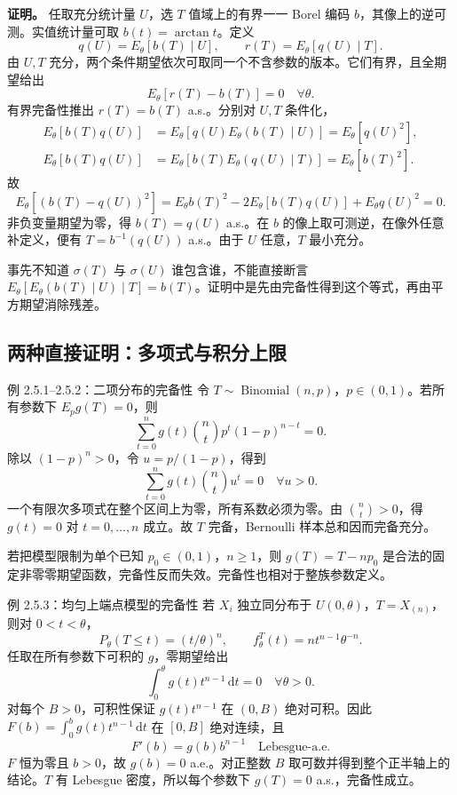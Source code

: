 \textbf{证明。} 任取充分统计量 $U$，选 $T$ 值域上的有界一一 Borel 编码 $b$，其像上的逆可测。实值统计量可取 $b(t)=\arctan t$。定义
\[
 q(U)=E_\theta[b(T)\mid U],\qquad
 r(T)=E_\theta[q(U)\mid T].
\]
由 $U,T$ 充分，两个条件期望依次可取同一个不含参数的版本。它们有界，且全期望给出
\[
 E_\theta[r(T)-b(T)]=0\quad\forall\theta.
\]
有界完备性推出 $r(T)=b(T)$ a.s.。分别对 $U,T$ 条件化，
\[
 \begin{aligned}
 E_\theta[b(T)q(U)]
 &=E_\theta[q(U)E_\theta(b(T)\mid U)]
 =E_\theta[q(U)^2],\\
 E_\theta[b(T)q(U)]
 &=E_\theta[b(T)E_\theta(q(U)\mid T)]
 =E_\theta[b(T)^2].
 \end{aligned}
\]
故
\[
 E_\theta[(b(T)-q(U))^2]
 =E_\theta b(T)^2-2E_\theta[b(T)q(U)]+E_\theta q(U)^2=0.
\]
非负变量期望为零，得 $b(T)=q(U)$ a.s.。在 $b$ 的像上取可测逆，在像外任意补定义，便有 $T=b^{-1}(q(U))$ a.s.。由于 $U$ 任意，$T$ 最小充分。

\begin{notebox}[为什么不能直接用塔式性质？]
事先不知道 $\sigma(T)$ 与 $\sigma(U)$ 谁包含谁，不能直接断言
$E_\theta[E_\theta(b(T)\mid U)\mid T]=b(T)$。证明中是先由完备性得到这个等式，再由平方期望消除残差。
\end{notebox}

\subsection{两种直接证明：多项式与积分上限}
\begin{examplebox}{例 2.5.1--2.5.2：二项分布的完备性}
令 $T\sim\operatorname{Binomial}(n,p)$，$p\in(0,1)$。若所有参数下 $E_pg(T)=0$，则
\[
 \sum_{t=0}^n g(t)\binom ntp^t(1-p)^{n-t}=0.
\]
除以 $(1-p)^n>0$，令 $u=p/(1-p)$，得到
\[
 \sum_{t=0}^ng(t)\binom ntu^t=0\quad\forall u>0.
\]
一个有限次多项式在整个区间上为零，所有系数必须为零。由 $\binom nt>0$，得 $g(t)=0$ 对 $t=0,\ldots,n$ 成立。故 $T$ 完备，Bernoulli 样本总和因而完备充分。
\end{examplebox}

若把模型限制为单个已知 $p_0\in(0,1)$，$n\ge1$，则 $g(T)=T-np_0$ 是合法的固定非零零期望函数，完备性反而失效。完备性也相对于整族参数定义。

\begin{examplebox}{例 2.5.3：均匀上端点模型的完备性}
若 $X_i$ 独立同分布于 $U(0,\theta)$，$T=X_{(n)}$，则对 $0<t<\theta$，
\[
 P_\theta(T\le t)=(t/\theta)^n,\qquad
 f_\theta^T(t)=nt^{n-1}\theta^{-n}.
\]
任取在所有参数下可积的 $g$，零期望给出
\[
 \int_0^\theta g(t)t^{n-1}\,\mathrm dt=0\quad\forall\theta>0.
\]
对每个 $B>0$，可积性保证 $g(t)t^{n-1}$ 在 $(0,B)$ 绝对可积。因此
$F(b)=\int_0^b g(t)t^{n-1}\,\mathrm dt$ 在 $[0,B]$ 绝对连续，且
\[
 F'(b)=g(b)b^{n-1}\quad\text{Lebesgue-a.e.}
\]
$F$ 恒为零且 $b>0$，故 $g(b)=0$ a.e.。对正整数 $B$ 取可数并得到整个正半轴上的结论。$T$ 有 Lebesgue 密度，所以每个参数下 $g(T)=0$ a.s.，完备性成立。
\end{examplebox}

